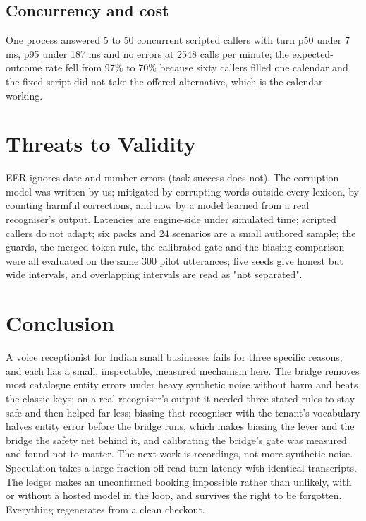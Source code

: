 \documentclass[conference]{IEEEtran}
\begin{document}
\subsection{Concurrency and cost}

One process answered 5 to 50 concurrent scripted callers with turn p50 under 7 ms, p95 under 187 ms and no errors at 2548 calls per minute; the expected-outcome rate fell from 97\% to 70\% because sixty callers filled one calendar and the fixed script did not take the offered alternative, which is the calendar working.

\section{Threats to Validity}

EER ignores date and number errors (task success does not). The corruption model was written by us; mitigated by corrupting words outside every lexicon, by counting harmful corrections, and now by a model learned from a real recogniser's output. Latencies are engine-side under simulated time; scripted callers do not adapt; six packs and 24 scenarios are a small authored sample; the guards, the merged-token rule, the calibrated gate and the biasing comparison were all evaluated on the same 300 pilot utterances; five seeds give honest but wide intervals, and overlapping intervals are read as "not separated".

\section{Conclusion}

A voice receptionist for Indian small businesses fails for three specific reasons, and each has a small, inspectable, measured mechanism here. The bridge removes most catalogue entity errors under heavy synthetic noise without harm and beats the classic keys; on a real recogniser's output it needed three stated rules to stay safe and then helped far less; biasing that recogniser with the tenant's vocabulary halves entity error before the bridge runs, which makes biasing the lever and the bridge the safety net behind it, and calibrating the bridge's gate was measured and found not to matter. The next work is recordings, not more synthetic noise. Speculation takes a large fraction off read-turn latency with identical transcripts. The ledger makes an unconfirmed booking impossible rather than unlikely, with or without a hosted model in the loop, and survives the right to be forgotten. Everything regenerates from a clean checkout.
\end{document}
